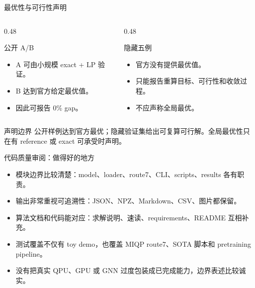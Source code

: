 \documentclass[aspectratio=169]{beamer}
\begin{document}
\begin{frame}{最优性与可行性声明}
\small
\begin{columns}[T,onlytextwidth]
\begin{column}{0.48\textwidth}
\begin{block}{公开 A/B}
\begin{itemize}
  \item A 可由小规模 exact + LP 验证。
  \item B 达到官方给定最优值。
  \item 因此可报告 0\% gap。
\end{itemize}
\end{block}
\end{column}
\begin{column}{0.48\textwidth}
\begin{block}{隐藏五例}
\begin{itemize}
  \item 官方没有提供最优值。
  \item 只能报告重算目标、可行性和收敛过程。
  \item 不应声称全局最优。
\end{itemize}
\end{block}
\end{column}
\end{columns}
\vspace{2mm}
\begin{alertblock}{声明边界}
公开样例达到官方最优；隐藏验证集给出可复算可行解。全局最优性只在有 reference 或 exact 可承受时声明。
\end{alertblock}
\end{frame}

\begin{frame}{代码质量审阅：做得好的地方}
\small
\begin{itemize}
  \item 模块边界比较清楚：model、loader、route7、CLI、scripts、results 各有职责。
  \item 输出非常重视可追溯性：JSON、NPZ、Markdown、CSV、图片都保留。
  \item 算法文档和代码能对应：求解说明、速读、requirements、README 互相补充。
  \item 测试覆盖不仅有 toy demo，也覆盖 MIQP route7、SOTA 脚本和 pretraining pipeline。
  \item 没有把真实 QPU、GPU 或 GNN 过度包装成已完成能力，边界表述比较诚实。
\end{itemize}
\end{frame}
\end{document}
